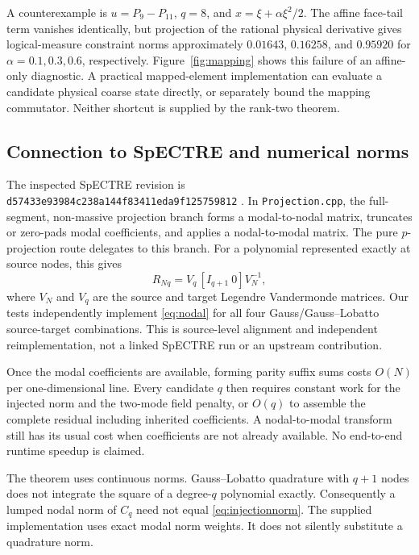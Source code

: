 \documentclass[11pt,a4paper]{article}
\theoremstyle{remark}\newtheorem{remark}[theorem]{Remark}
\begin{document}
A counterexample is \(u=P_9-P_{11}\), \(q=8\), and
\(x=\xi+\alpha\xi^2/2\). The affine face-tail term vanishes identically,
but projection of the rational physical derivative gives logical-measure
constraint norms approximately \(0.01643\), \(0.16258\), and \(0.95920\)
for \(\alpha=0.1,0.3,0.6\), respectively. Figure~\ref{fig:mapping}
shows this failure of an affine-only diagnostic. A practical mapped-element
implementation can evaluate a candidate physical coarse state directly, or
separately bound the mapping commutator. Neither shortcut is supplied by the
rank-two theorem.

\subsection{Connection to SpECTRE and numerical norms}
The inspected SpECTRE revision is
\texttt{d57433e93984c238a144f83411eda9f125759812}
\cite{spectrecode}. In \texttt{Projection.cpp}, the full-segment,
non-massive projection branch forms a modal-to-nodal matrix, truncates or
zero-pads modal coefficients, and applies a nodal-to-modal matrix.
The pure \(p\)-projection route delegates to this branch. For a polynomial
represented exactly at source nodes, this gives
\begin{equation}
 R_{Nq}=V_q\,[I_{q+1}\ 0]V_N^{-1},
 \label{eq:nodal}
\end{equation}
where \(V_N\) and \(V_q\) are the source and target Legendre Vandermonde
matrices. Our tests independently implement \eqref{eq:nodal} for all four
Gauss/Gauss--Lobatto source-target combinations. This is source-level
alignment and independent reimplementation, not a linked SpECTRE run or an
upstream contribution.

Once the modal coefficients are available, forming parity suffix sums costs
\(O(N)\) per one-dimensional line. Every candidate \(q\) then requires
constant work for the injected norm and the two-mode field penalty, or
\(O(q)\) to assemble the complete residual including inherited coefficients.
A nodal-to-modal transform still has its usual cost when coefficients are
not already available. No end-to-end runtime speedup is claimed.

The theorem uses continuous norms. Gauss--Lobatto quadrature with \(q+1\)
nodes does not integrate the square of a degree-\(q\) polynomial exactly.
Consequently a lumped nodal norm of \(C_q\) need not equal
\eqref{eq:injectionnorm}. The supplied implementation uses exact modal norm
weights. It does not silently substitute a quadrature norm.
\end{document}
